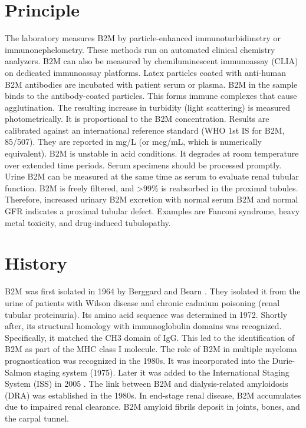 \section*{Principle}
The laboratory measures B2M by particle-enhanced immunoturbidimetry or immunonephelometry. These methods run on automated clinical chemistry analyzers. B2M can also be measured by chemiluminescent immunoassay (CLIA) on dedicated immunoassay platforms. Latex particles coated with anti-human B2M antibodies are incubated with patient serum or plasma. B2M in the sample binds to the antibody-coated particles. This forms immune complexes that cause agglutination. The resulting increase in turbidity (light scattering) is measured photometrically. It is proportional to the B2M concentration. Results are calibrated against an international reference standard (WHO 1st IS for B2M, 85/507). They are reported in mg/L (or mcg/mL, which is numerically equivalent). B2M is unstable in acid conditions. It degrades at room temperature over extended time periods. Serum specimens should be processed promptly. Urine B2M can be measured at the same time as serum to evaluate renal tubular function. B2M is freely filtered, and >99\% is reabsorbed in the proximal tubules. Therefore, increased urinary B2M excretion with normal serum B2M and normal GFR indicates a proximal tubular defect. Examples are Fanconi syndrome, heavy metal toxicity, and drug-induced tubulopathy.

\section*{History}
B2M was first isolated in 1964 by Berggard and Bearn \cite{berggard1968isolation}. They isolated it from the urine of patients with Wilson disease and chronic cadmium poisoning (renal tubular proteinuria). Its amino acid sequence was determined in 1972. Shortly after, its structural homology with immunoglobulin domains was recognized. Specifically, it matched the CH3 domain of IgG. This led to the identification of B2M as part of the MHC class I molecule. The role of B2M in multiple myeloma prognostication was recognized in the 1980s. It was incorporated into the Durie-Salmon staging system (1975). Later it was added to the International Staging System (ISS) in 2005 \cite{greipp2005international}. The link between B2M and dialysis-related amyloidosis (DRA) was established in the 1980s. In end-stage renal disease, B2M accumulates due to impaired renal clearance. B2M amyloid fibrils deposit in joints, bones, and the carpal tunnel.

